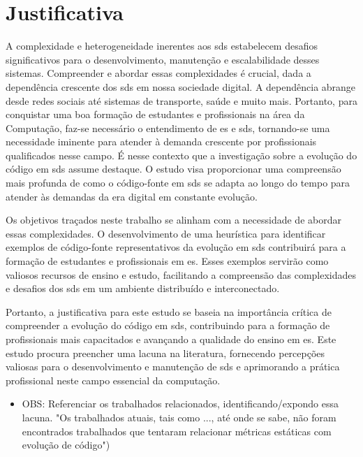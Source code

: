 \section{Justificativa}\label{sec:justificativa}
A complexidade e heterogeneidade inerentes aos \gls{sds} estabelecem desafios significativos para o desenvolvimento, manutenção e escalabilidade desses sistemas. Compreender e abordar essas complexidades é crucial, dada a dependência crescente dos \gls{sds} em nossa sociedade digital. A dependência abrange desde redes sociais até sistemas de transporte, saúde e muito mais. Portanto, para conquistar uma boa formação de estudantes e profissionais na área da Computação, faz-se necessário o entendimento de \gls{es} e \gls{sds}, tornando-se uma necessidade iminente para atender à demanda crescente por profissionais qualificados nesse campo.
É nesse contexto que a investigação sobre a evolução do código em \gls{sds} assume destaque. O estudo visa proporcionar uma compreensão mais profunda de como o código-fonte em \gls{sds} se adapta ao longo do tempo para atender às demandas da era digital em constante evolução.

Os objetivos traçados neste trabalho se alinham com a necessidade de abordar essas complexidades. O desenvolvimento de uma heurística para identificar exemplos de código-fonte representativos da evolução em \gls{sds} contribuirá para a formação de estudantes e profissionais em \gls{es}. Esses exemplos servirão como valiosos recursos de ensino e estudo, facilitando a compreensão das complexidades e desafios dos \gls{sds} em um ambiente distribuído e interconectado.

Portanto, a justificativa para este estudo se baseia na importância crítica de compreender a evolução do código em \gls{sds}, contribuindo para a formação de profissionais mais capacitados e avançando a qualidade do ensino em \gls{es}. Este estudo procura preencher uma lacuna na literatura, fornecendo percepções valiosas para o desenvolvimento e manutenção de \gls{sds} e aprimorando a prática profissional neste campo essencial da computação.

\begin{itemize}
    \item OBS: Referenciar os trabalhados relacionados, identificando/expondo essa lacuna. "Os trabalhados atuais, tais como ..., até onde se sabe, não foram encontrados trabalhados que tentaram relacionar métricas estáticas com evolução de código")
\end{itemize}

